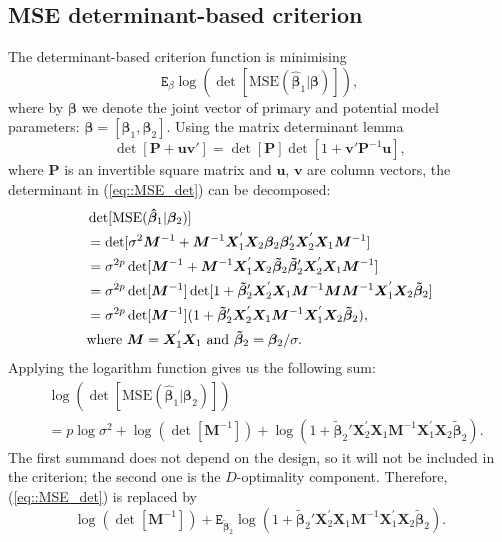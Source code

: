 \subsection{MSE determinant-based criterion}
\label{sec::msed}
The determinant-based criterion function is minimising
\begin{equation}
\label{eq::MSE_det}
\mathtt{E}_{\beta}\log(\det[\mbox{MSE}(\bm{\hat{\beta}}_1|\bm{\beta})]),
\end{equation}
where by $\bm{\beta}$ we denote the joint vector of primary and potential model parameters: $\bm{\beta}=[\bm{\beta}_1, \bm{\beta}_2]$.
Using the matrix determinant lemma \citep{Harville2006matrix}
\begin{equation*}
\det[\bm{P}+\bm{uv}']=\det[\bm{P}]\det[1+\bm{v'}\bm{P}^{-1}\bm{u}], 
\end{equation*}
where $\bm{P}$ is an invertible square matrix and $\bm{u}$, $\bm{v}$ are column vectors, the determinant in (\ref{eq::MSE_det}) can be decomposed:
\begin{align}
\label{eq::mse_det_dec}
&\det[\mbox{MSE}(\bm{\hat{\beta}}_1|\bm{\beta}_2)]\notag\\&=\det[\sigma^2\bm{M}^{-1}+\bm{M}^{-1}\bm{X}_1^{'}\bm{X}_2\bm{\beta}_2\bm{\beta}_2'\bm{X}_2^{'}\bm{X}_1\bm{M}^{-1}]\notag\\&=\sigma^{2p}\det[\bm{M}^{-1}+\bm{M}^{-1}\bm{X}_1^{'}\bm{X}_2\bm{\tilde{\beta}}_2\bm{\tilde{\beta}}_2'\bm{X}_2^{'}\bm{X}_1\bm{M}^{-1}]\notag\\&=\sigma^{2p}\det[\bm{M}^{-1}]\det[1+\bm{\tilde{\beta}}_2'\bm{X}_2^{'}\bm{X}_1\bm{M}^{-1}\bm{M}\bm{M}^{-1}\bm{X}_1^{'}\bm{X}_2\bm{\tilde{\beta}}_2]\notag\\&=\sigma^{2p}\det[\bm{M}^{-1}](1+\bm{\tilde{\beta}}_2'\bm{X}_2^{'}\bm{X}_1\bm{M}^{-1}\bm{X}_1^{'}\bm{X}_2\bm{\tilde{\beta}}_2),\\
&\mbox{where } \bm{M}=\bm{X}_1^{'}\bm{X}_1 \mbox{ and }\bm{\tilde{\beta}}_2=\bm{\beta}_2/\sigma. \notag
\end{align}
Applying the logarithm function gives us the following sum:
\begin{align*}
&\log(\det[\mbox{MSE}(\bm{\hat{\beta}}_1|\bm{\beta}_2)])\\&=p\log\sigma^2+\log(\det[\bm{M}^{-1}])+\log(1+\bm{\tilde{\beta}}_2'\bm{X}_2^{'}\bm{X}_1\bm{M}^{-1}\bm{X}_1^{'}\bm{X}_2\bm{\tilde{\beta}}_2). 
\end{align*}
The first summand does not depend on the design, so it will not be included in the criterion; the second one is the $D$-optimality component. Therefore, (\ref{eq::MSE_det}) is replaced by
\begin{equation*}
\log(\det[\bm{M}^{-1}])+\mathtt{E}_{\bm{\tilde{\beta}}_2}\log(1+\bm{\tilde{\beta}}_2'\bm{X}_2^{'}\bm{X}_1\bm{M}^{-1}\bm{X}_1^{'}\bm{X}_2\bm{\tilde{\beta}}_2).
\end{equation*}

